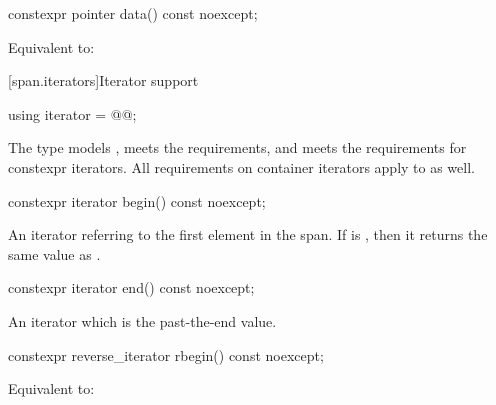 %
\begin{itemdecl}
constexpr pointer data() const noexcept;
\end{itemdecl}

\begin{itemdescr}
\pnum
\effects
Equivalent to: 
\end{itemdescr}

[span.iterators]{Iterator support}

%
\begin{itemdecl}
using iterator = @@;
\end{itemdecl}

\begin{itemdescr}
\pnum
The type
models ,
meets the 
requirements,
and
meets the requirements for
constexpr iterators.
All requirements on container iterators apply to
 as well.
\end{itemdescr}

%
\begin{itemdecl}
constexpr iterator begin() const noexcept;
\end{itemdecl}

\begin{itemdescr}
\pnum
\returns
An iterator referring to the first element in the span.
If  is , then it returns the
same value as .
\end{itemdescr}

%
\begin{itemdecl}
constexpr iterator end() const noexcept;
\end{itemdecl}

\begin{itemdescr}
\pnum
\returns
An iterator which is the past-the-end value.
\end{itemdescr}

%
\begin{itemdecl}
constexpr reverse_iterator rbegin() const noexcept;
\end{itemdecl}

\begin{itemdescr}
\pnum
\effects
Equivalent to: 
\end{itemdescr}

